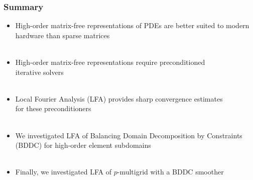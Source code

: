 \documentclass{beamer}
\begin{document}
\begin{frame}
\begin{center}
\frametitle{Summary}

\begin{itemize}

\item High-order matrix-free representations of PDEs are better suited to modern hardware than sparse matrices\\

~\\

\item High-order matrix-free representations require preconditioned\\iterative solvers\\

~\\

\item Local Fourier Analysis (LFA) provides sharp convergence estimates\\for these preconditioners\\

~\\

\item We investigated LFA of Balancing Domain Decomposition by Constraints (BDDC) for high-order element subdomains\\

~\\

\item Finally, we investigated LFA of $p$-multigrid with a BDDC smoother

\end{itemize}

\end{center}
\end{frame}


\begin{frame}[noframenumbering]
\titlepage %
\end{frame}

\end{document}
